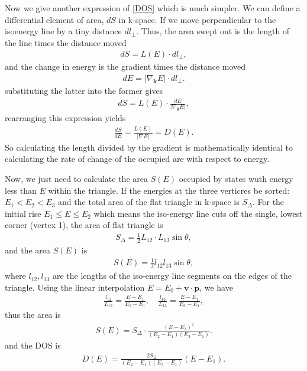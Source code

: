 \documentclass[10pt, oneside]{article}
\newcommand{\p}[1]{\left(#1\right)}
\newcommand{\bv}[1]{\left|#1\right|}
\begin{document}
Now we give another expression of \eqref{DOS} which is much simpler. We can define a differential element of area, \(d S\) in k-space. If we move perpendicular to the isoenergy line by a tiny distance \(d l_{\bot}\). Thus, the area swept out is the length of the line times the distance moved 
\begin{align}
	d S = L\p{E} \cdot d l_{\bot},
\end{align}
and the change in energy is the gradient times the distance moved
\begin{align}
	d E = \bv{\nabla_{\bm{k}} E} \cdot d l_{\bot}.
\end{align}
substituting the latter into the former gives
\begin{align}
	d S = L \p{E} \cdot \frac{d E}{\bv{\nabla_{\bm{k}} E}},	
\end{align}
rearranging this expression yields
\begin{align}
	\frac{d S}{d E} = \frac{L \p{E}}{ \bv{\nabla E}} = D \p{E}.
\end{align}
So calculating the length divided by the gradient is mathematically identical to calculating the rate of change of the occupied are with respect to energy.

Now, we just need to calculate the area \(S \p{E}\)  occupied by states wuth energy less than \(E\) within the triangle. If the energies at the three verticres be sorted: \(E_{1} < E_{2} < E_{3}\) and the total area of the flat triangle in k-space is \(S_{\Delta}\). For the initial rise \(E_1 \leq E \leq E_2\) which means the iso-energy line cuts off the single, lowest corner (vertex 1), the area of flat triangle is 
\begin{align}
	S_{\Delta} = \frac{1}{2} L_{12} \cdot L_{13} \sin{\theta},
\end{align}
and the area \(S\p{E}\) is
\begin{align}
	S\p{E} = \frac{1}{2} l_{12} l_{13} \sin{\theta},
\end{align}
where \(l_{12}, l_{13}\) are the lengths of the iso-energy line segments on the edges of the triangle. Using the linear interpolation \(E = E_0 + \bm{v} \cdot \bm{p}\), we have
\begin{align}
	\frac{l_{12} }{L_{12}} = \frac{E - E_1}{E_2 - E_1}, \quad \frac{l_{13} }{L_{13} } = \frac{E - E_1}{E_3 - E_1},
\end{align}
thus the area is
\begin{align}
	S\p{E} = S_{\Delta} \cdot \frac{\p{E - E_1}^{2}}{\p{E_2 - E_1} \p{E_3 - E_1}}.
\end{align}
and the DOS is 
\begin{align}
	D\p{E} = \frac{2 S_{\Delta}}{\p{E_2 - E_1} \p{E_3 - E_1}} \p{E - E_1}.
\end{align}
\end{document}
